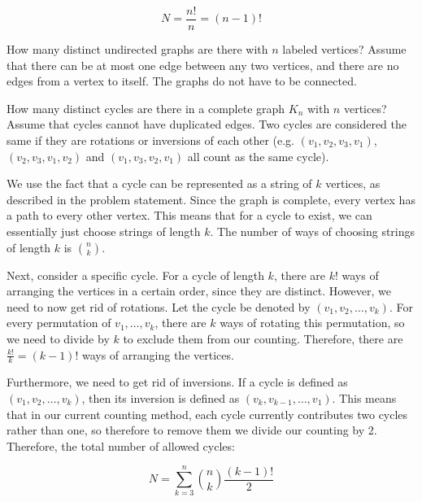 \documentclass[11pt]{article}
\begin{document}
\begin{Parts}
\begin{solution}
      \[ N = \frac{n!}{n} = (n-1)!\] 
    \end{solution}
    

    \Part How many distinct undirected graphs are there with $n$ labeled vertices? Assume that there can be at most one edge between any two vertices, and there are no edges from a vertex to itself. The graphs do not have to be connected.
    
    \begin{solution}

    \end{solution}

    \Part How many distinct cycles are there in a complete graph $K_n$ with $n$
     vertices? Assume that cycles cannot have duplicated edges. Two cycles are
     considered the same if they are rotations or inversions of each other (e.g.
     $(v_1,v_2,v_3,v_1)$, $(v_2,v_3,v_1,v_2)$ and $(v_1,v_3,v_2,v_1)$ all count as
     the same cycle).
     
     \begin{solution}
      We use the fact that a cycle can be represented as a string of $k$ vertices, as described in the problem statement. Since the graph is complete, every vertex has a path to every other vertex. This means that for a cycle to exist, we can essentially just choose strings of length $k$. The number of ways of choosing strings of length $k$ is $n \choose k$. 
      
      Next, consider a specific cycle. For a cycle of length $k$, there are $k!$ ways of arranging the vertices in a certain order, since they are distinct. However, we need to now get rid of rotations. Let the cycle be denoted by $(v_1, v_2, \dots, v_k)$. For every permutation of $v_1, \dots, v_k$, there are $k$ ways of rotating this permutation, so we need to divide by $k$ to exclude them from our counting. Therefore, there are $\frac{k!}{k} = (k-1)!$ ways of arranging the vertices. 

      Furthermore, we need to get rid of inversions. If a cycle is defined as $(v_1, v_2, \dots, v_k)$, then its inversion is defined as $(v_k, v_{k-1}, \dots, v_1)$. This means that in our current counting method, each cycle currently contributes two cycles rather than one, so therefore to remove them we divide our counting by 2. Therefore, the total number of allowed cycles: 

      \[ N = \sum_{k = 3}^n{n \choose k} \frac{(k-1)!}{2}\] 
      \end{solution}

\end{Parts}
\pagebreak
{}
\end{document}
